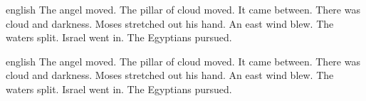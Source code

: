 \documentclass{article}
\begin{document}
\begin{mekor}
\begin{mekorlang}{english}
\pasuk[14:19]  The angel moved.  The pillar of cloud moved. \pasuk {} It came between.  There was cloud and darkness. \pasuk {} Moses stretched out his hand.  An east wind blew.  The waters split. \pasuk Israel went in. \pasuk {} The Egyptians pursued.
\end{mekorlang}
\end{mekor}
\begin{mekor}
\begin{mekorlang}{english}
\pasuk[14:19]  The angel moved.  The pillar of cloud moved. \pasuk {} It came between.  There was cloud and darkness. \pasuk {} Moses stretched out his hand.  An east wind blew.  The waters split. \pasuk Israel went in. \pasuk {} The Egyptians pursued.
\end{mekorlang}
\end{mekor}
\end{document}
